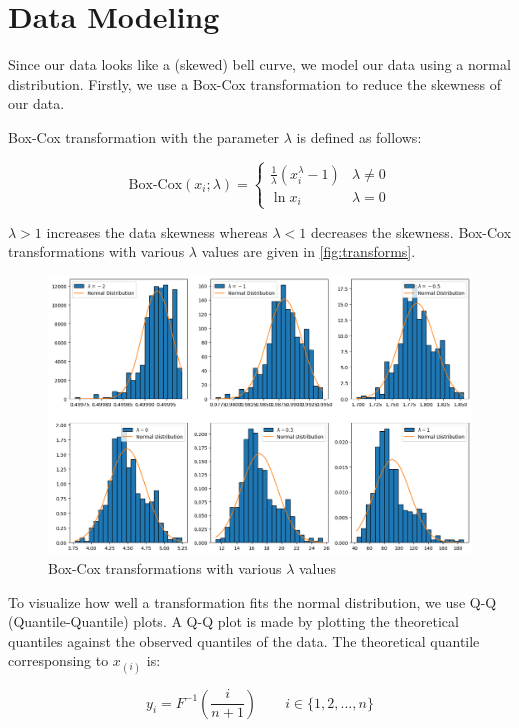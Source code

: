 \section{Data Modeling}

Since our data looks like a (skewed) bell curve, we model our data using a normal distribution.
Firstly, we use a Box-Cox transformation to reduce the skewness of our data.

Box-Cox transformation with the parameter $\lambda$ is defined as follows:

\[
  \text{Box-Cox}(x_i; \lambda) =
  \begin{cases}
    \frac{1}{\lambda} (x_i ^ \lambda - 1) & \lambda \ne 0 \\
    \ln x_i & \lambda = 0
  \end{cases}
\]

\noindent $\lambda > 1$ increases the data skewness whereas $\lambda < 1$ decreases the skewness.
Box-Cox transformations with various $\lambda$ values are given in \autoref{fig:transforms}.

\begin{figure}[!ht]
  \centering
  \includegraphics[width=\textwidth]{images/transforms.png}
  \caption{Box-Cox transformations with various $\lambda$ values}
  \label{fig:transforms}
\end{figure}

To visualize how well a transformation fits the normal distribution, we use Q-Q (Quantile-Quantile) plots.
A Q-Q plot is made by plotting the theoretical quantiles against the observed quantiles of the data.
The theoretical quantile corresponsing to $x_{(i)}$ is:

\[ y_i = F^{-1}\left(\frac{i}{n + 1}\right) \qquad i \in \{1, 2, ..., n\} \]

